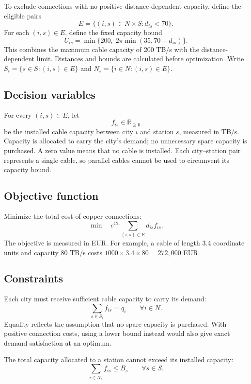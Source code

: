 \documentclass[11pt,a4paper]{article}
\begin{document}
To exclude connections with no positive distance-dependent capacity, define the eligible pairs
\[
E=\{(i,s)\in N\times S:d_{is}<70\}.
\]
For each $(i,s)\in E$, define the fixed capacity bound
\begin{equation}
U_{is}=\min\{200,\;2\pi\min(35,70-d_{is})\}.
\label{eq:copper-bound}
\end{equation}
This combines the maximum cable capacity of 200 TB/s with the distance-dependent limit. Distances and bounds are calculated before optimization. Write $S_i=\{s\in S:(i,s)\in E\}$ and $N_s=\{i\in N:(i,s)\in E\}$.

\subsection{Decision variables}
For every $(i,s)\in E$, let
\[
f_{is}\in\mathbb{R}_{\ge0}
\]
be the installed cable capacity between city $i$ and station $s$, measured in TB/s. Capacity is allocated to carry the city's demand; no unnecessary spare capacity is purchased. A zero value means that no cable is installed. Each city--station pair represents a single cable, so parallel cables cannot be used to circumvent its capacity bound.

\subsection{Objective function}
Minimize the total cost of copper connections:
\begin{equation}
\min\quad c^{\mathrm{Cu}}\sum_{(i,s)\in E}d_{is}f_{is}.
\label{eq:copper-objective}
\end{equation}
The objective is measured in EUR. For example, a cable of length 3.4 coordinate units and capacity 80 TB/s costs $1000\times3.4\times80=272{,}000$ EUR.

\subsection{Constraints}
Each city must receive sufficient cable capacity to carry its demand:
\begin{equation}
\sum_{s\in S_i}f_{is}=q_i
\qquad\forall i\in N.
\label{eq:copper-demand}
\end{equation}
Equality reflects the assumption that no spare capacity is purchased. With positive connection costs, using a lower bound instead would also give exact demand satisfaction at an optimum.

The total capacity allocated to a station cannot exceed its installed capacity:
\begin{equation}
\sum_{i\in N_s}f_{is}\le B_s
\qquad\forall s\in S.
\label{eq:copper-station}
\end{equation}
\end{document}
